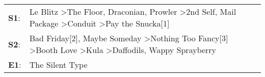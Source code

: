 \begin{supertabular}{p{0.03\textwidth}p{0.92\textwidth}}
 \textbf{S1}:  &  Le Blitz\textsuperscript{} \textgreater \enspace The Floor\textsuperscript{}, \enspace Draconian\textsuperscript{}, \enspace Prowler\textsuperscript{} \textgreater \enspace 2nd Self\textsuperscript{}, \enspace Mail Package\textsuperscript{} \textgreater \enspace Conduit\textsuperscript{} \textgreater \enspace Pay the Snucka[1]\textsuperscript{}  \enspace  \\
 \textbf{S2}:  &                       Bad Friday[2]\textsuperscript{}, \enspace Maybe Someday\textsuperscript{} \textgreater \enspace Nothing Too Fancy[3]\textsuperscript{} \textgreater \enspace Booth Love\textsuperscript{} \textgreater \enspace Kula\textsuperscript{} \textgreater \enspace Daffodils\textsuperscript{}, \enspace Wappy Sprayberry\textsuperscript{}  \enspace  \\
 \textbf{E1}:  &                                                                                                                                                                                                                                                                                                                           The Silent Type\textsuperscript{}  \enspace  \\
\end{supertabular}

